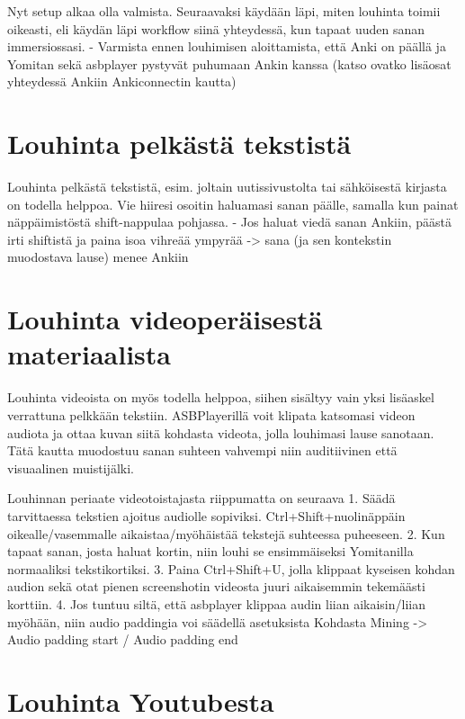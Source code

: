 \documentclass[
]{book}
\begin{document}
Nyt setup alkaa olla valmista. Seuraavaksi käydään läpi, miten louhinta toimii oikeasti, eli käydän läpi workflow siinä yhteydessä, kun tapaat uuden sanan immersiossasi.
- Varmista ennen louhimisen aloittamista, että Anki on päällä ja Yomitan sekä asbplayer pystyvät puhumaan Ankin kanssa (katso ovatko lisäosat yhteydessä Ankiin Ankiconnectin kautta)

\section{Louhinta pelkästä tekstistä}\label{Louhinta-pelkasta-tekstista}

Louhinta pelkästä tekstistä, esim. joltain uutissivustolta tai sähköisestä kirjasta on todella helppoa. Vie hiiresi osoitin haluamasi sanan päälle, samalla kun painat näppäimistöstä shift-nappulaa pohjassa.
- Jos haluat viedä sanan Ankiin, päästä irti shiftistä ja paina isoa vihreää ympyrää -\textgreater{} sana (ja sen kontekstin muodostava lause) menee Ankiin

\section{Louhinta videoperäisestä materiaalista}\label{Louhinta-videoperaisesta-materiaalista}

Louhinta videoista on myös todella helppoa, siihen sisältyy vain yksi lisäaskel verrattuna pelkkään tekstiin. ASBPlayerillä voit klipata katsomasi videon audiota ja ottaa kuvan siitä kohdasta videota, jolla louhimasi lause sanotaan. Tätä kautta muodostuu sanan suhteen vahvempi niin auditiivinen että visuaalinen muistijälki.

Louhinnan periaate videotoistajasta riippumatta on seuraava
1. Säädä tarvittaessa tekstien ajoitus audiolle sopiviksi. Ctrl+Shift+nuolinäppäin oikealle/vasemmalle aikaistaa/myöhäistää tekstejä suhteessa puheeseen.
2. Kun tapaat sanan, josta haluat kortin, niin louhi se ensimmäiseksi Yomitanilla normaaliksi tekstikortiksi.
3. Paina Ctrl+Shift+U, jolla klippaat kyseisen kohdan audion sekä otat pienen screenshotin videosta juuri aikaisemmin tekemäästi korttiin.
4. Jos tuntuu siltä, että asbplayer klippaa audin liian aikaisin/liian myöhään, niin audio paddingia voi säädellä asetuksista Kohdasta Mining -\textgreater{} Audio padding start / Audio padding end

\section{Louhinta Youtubesta}\label{louhinta-youtubesta}
\end{document}
